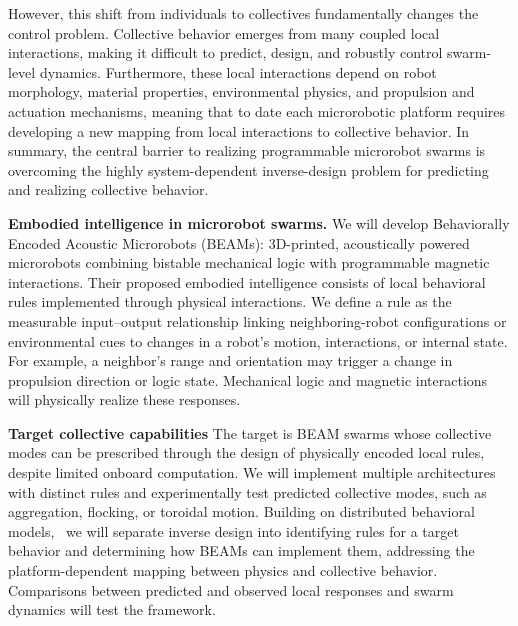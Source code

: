 \documentclass[11pt]{article}
\let\cite=\supercite
\begin{document}
However, this shift from individuals to collectives fundamentally changes the control problem.
Collective behavior emerges from many coupled local interactions, making it difficult to predict, design, and robustly control swarm-level dynamics.
Furthermore, these local interactions depend on robot morphology, material properties, environmental physics, and propulsion and actuation mechanisms, meaning that to date each microrobotic platform requires developing a new mapping from local interactions to collective behavior.
In summary, the central barrier to realizing programmable microrobot swarms is overcoming the highly system-dependent inverse-design problem for predicting and realizing collective behavior.

\textbf{Embodied intelligence in microrobot swarms.}
We will develop Behaviorally Encoded Acoustic Microrobots (BEAMs): 3D-printed, acoustically powered microrobots combining bistable mechanical logic with programmable magnetic interactions.
Their proposed embodied intelligence consists of local behavioral rules implemented through physical interactions.
We define a rule as the measurable input--output relationship linking neighboring-robot configurations or environmental cues to changes in a robot's motion, interactions, or internal state.
For example, a neighbor's range and orientation may trigger a change in propulsion direction or logic state.
Mechanical logic and magnetic interactions will physically realize these responses.

\textbf{Target collective capabilities}
The target is BEAM swarms whose collective modes can be prescribed through the design of physically encoded local rules, despite limited onboard computation.
We will implement multiple architectures with distinct rules and experimentally test predicted collective modes, such as aggregation, flocking, or toroidal motion.
Building on distributed behavioral models,~\cite{Reynolds1987Boids,Vicsek1995SelfDrivenParticles,Couzin2002CollectiveMemory}
we will separate inverse design into identifying rules for a target behavior and determining how BEAMs can implement them, addressing the platform-dependent mapping between physics and collective behavior.
Comparisons between predicted and observed local responses and swarm dynamics will test the framework.
\end{document}

